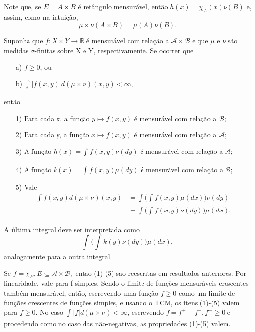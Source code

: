 \documentclass[MeasureTheory/measure_theory.tex]{subfiles}
\begin{document}
Note que, se \(E = A\times B\) é retângulo mensurável, então \(h(x) = \chi_{A}(x)\nu(B)\) e, assim, como na intuição,
\[
	\mu \times \nu(A\times B) = \mu (A) \nu(B).
\]
\hypertarget{fubini_tonelli}{
	\begin{theorem*}
		Suponha que \(f:X\times Y\rightarrow \mathbb{R}\) é mensurável com relação a \(\mathcal{A}\times \mathcal{B}\) e que \(\mu \) e \(\nu\) são medidas \(\sigma \)-finitas sobre X e Y, respectivamente. Se ocorrer que
		\begin{itemize}
			\item[a)] \(f\geq 0\), ou
			\item[b)] \(\int_{}|f(x, y)| d(\mu\times \nu_{})(x, y) < \infty,\)
		\end{itemize}
		então
		\begin{itemize}
			\item[1)] Para cada x, a função \(y\mapsto f(x, y)\) é mensurável com relação a \(\mathcal{B}\);
			\item[2)] Para cada y, a função \(x\mapsto f(x, y)\) é mensurável com relação a \(\mathcal{A}\);
			\item[3)] A função \(h(x) = \int_{}f(x, y)\nu( dy)\) é mensurável com relação a \(\mathcal{A}\);
			\item[4)] A função \(k(x) = \int_{}f(x, y)\mu( dy)\) é mensurável com relação a \(\mathcal{B}\);
			\item[5)] Vale
			      \begin{align*}
				      \int_{}f(x, y) d(\mu\times \nu)(x, y)_{} & = \int_{}\biggl(\int_{}^{}f(x, y)\mu (dx)\biggr) \nu(dy)    \\
				                                               & = \int_{}^{}\biggl(\int_{}^{}f(x, y)\nu(dy)\biggr)\mu (dx).
			      \end{align*}
		\end{itemize}
	\end{theorem*}}
A última integral deve ser interpretada como
\[
	\int_{}^{}\biggl(\int_{}^{}k(y)\nu(dy)\biggr)\mu (dx),
\]
analogamente para a outra integral.
\begin{proof*}
	Se \(f = \chi_{E}, E\subseteq \mathcal{A}\times \mathcal{B},\) então (1)-(5) são reescritas em resultados anteriores.
	Por linearidade, vale para f simples. Sendo o limite de funções mensuráveis crescentes também mensurável, então, escrevendo uma função \(f\geq 0\) como um limite de funções crescentes de funções
	simples, e usando o TCM, os itens (1)-(5) valem para \(f\geq 0\). No caso \(\int_{}|f| d(\mu\times\nu_{}) < \infty\), escrevendo \(f=f^{+}-f^{-}, f^{\pm}\geq 0\) e procedendo como no caso das não-negativas,
	as propriedades (1)-(5) valem. \qedsymbol
\end{proof*}
\end{document}
